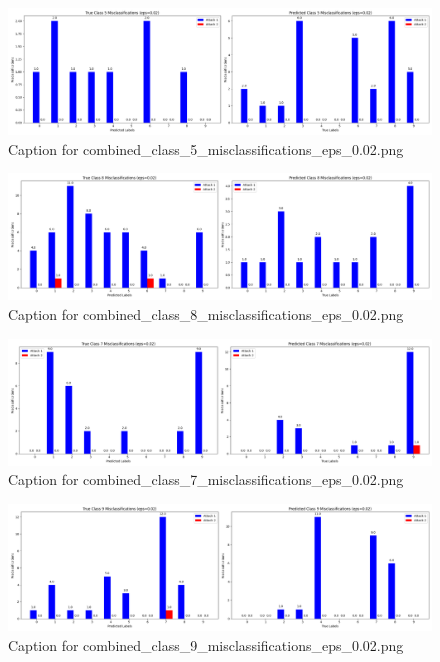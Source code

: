\documentclass[11pt,onside]{article}
\begin{document}
\begin{figure}[ht]
\centering
\includegraphics[width=1\textwidth]{combined_class_boundary_pgd/combined_class_5_misclassifications_eps_0.02.png}
\caption{Caption for combined_class_5_misclassifications_eps_0.02.png}
\label{fig:combined_class_5_misclassifications_eps_0.02.png}
\end{figure}

\begin{figure}[ht]
\centering
\includegraphics[width=1\textwidth]{combined_class_boundary_pgd/combined_class_8_misclassifications_eps_0.02.png}
\caption{Caption for combined_class_8_misclassifications_eps_0.02.png}
\label{fig:combined_class_8_misclassifications_eps_0.02.png}
\end{figure}

\begin{figure}[ht]
\centering
\includegraphics[width=1\textwidth]{combined_class_boundary_pgd/combined_class_7_misclassifications_eps_0.02.png}
\caption{Caption for combined_class_7_misclassifications_eps_0.02.png}
\label{fig:combined_class_7_misclassifications_eps_0.02.png}
\end{figure}


\begin{figure}[ht]
\centering
\includegraphics[width=1\textwidth]{combined_class_boundary_pgd/combined_class_9_misclassifications_eps_0.02.png}
\caption{Caption for combined_class_9_misclassifications_eps_0.02.png}
\label{fig:combined_class_9_misclassifications_eps_0.02.png}
\end{figure}
\end{document}
